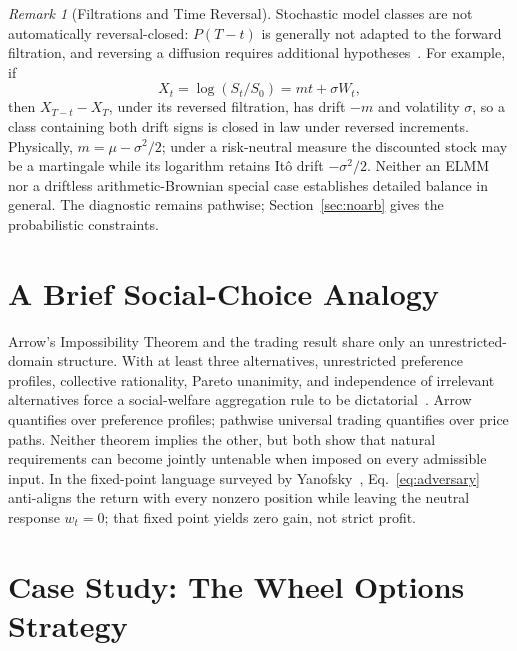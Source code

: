 \documentclass[aps,pra,reprint,superscriptaddress,amsmath,amssymb,floatfix]{revtex4-2}
\theoremstyle{plain}
\theoremstyle{definition}
\theoremstyle{remark}
\newtheorem{remark}{Remark}
\begin{document}
\begin{remark}[Filtrations and Time Reversal]
Stochastic model classes are not automatically reversal-closed:
\(P(T-t)\) is generally not adapted to the forward filtration, and reversing a
diffusion requires additional hypotheses~\cite{HaussmannPardoux1986}. For
example, if
\[
  X_t=\log(S_t/S_0)=mt+\sigma W_t,
\]
then \(X_{T-t}-X_T\), under its reversed filtration, has drift \(-m\) and
volatility \(\sigma\), so a class containing both drift signs is closed in law
under reversed increments. Physically, \(m=\mu-\sigma^2/2\); under a
risk-neutral measure the discounted stock may be a martingale while its
logarithm retains It\^o drift \(-\sigma^2/2\). Neither an ELMM nor a driftless
arithmetic-Brownian special case establishes detailed balance in general. The
diagnostic remains pathwise; Section~\ref{sec:noarb} gives the probabilistic
constraints.
\end{remark}

\section{A Brief Social-Choice Analogy}
\label{sec:arrow}

Arrow's Impossibility Theorem and the trading result share only an
unrestricted-domain structure. With at least three alternatives, unrestricted
preference profiles, collective rationality, Pareto unanimity, and independence
of irrelevant alternatives force a social-welfare aggregation rule to be
dictatorial~\cite{Arrow1963}. Arrow quantifies over preference profiles;
pathwise universal trading quantifies over price paths. Neither theorem implies
the other, but both show that natural requirements can become jointly
untenable when imposed on every admissible input. In the fixed-point language
surveyed by Yanofsky~\cite{Yanofsky-BSL:9051621},
Eq.~\eqref{eq:adversary} anti-aligns the return with every nonzero position
while leaving the neutral response \(w_t=0\); that fixed point yields zero
gain, not strict profit.

\section{Case Study: The Wheel Options Strategy}
\label{sec:wheel}
\end{document}
